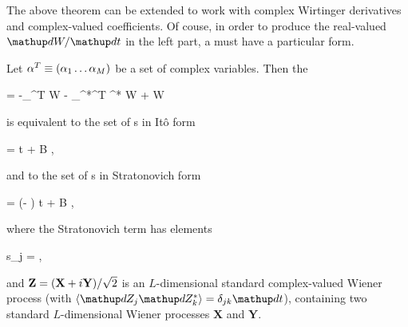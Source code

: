 The above theorem can be extended to work with complex Wirtinger derivatives and complex-valued coefficients.
Of couse, in order to produce the real-valued $\upd W/\upd t$ in the left part, a  must have a particular form.

\begin{theorem}
\label{thm:fpe-sde:corr:fpe-sde-complex}
	Let $\mathbf{\alpha}^T \equiv (\alpha_1 \ldots \alpha_M)$ be a set of complex variables.
	Then the 
	\begin{eqn*}
		= -\vcwd_{\balpha}^T \avec W - \vcwd_{\balpha^*}^T \avec^* W
		+  W
	\end{eqn*}
	is equivalent to the set of s in It\^{o} form
	\begin{eqn*}
		\upd\balpha = \avec \upd t + B \upd\Zvec,
	\end{eqn*}
	and to the set of s in Stratonovich form
	\begin{eqn*}
		\upd\balpha = (\avec - \svec) \upd t + B \upd\Zvec,
	\end{eqn*}
	where the Stratonovich term has elements
	\begin{eqn*}
		s_j =  \Trace{ B^H \vcwd_{\balpha^*} \evec_j^T B },
	\end{eqn*}
	and $\mathbf{Z} = (\mathbf{X} + i\mathbf{Y}) / \sqrt{2}$ is an $L$-dimensional standard complex-valued Wiener process (with $\langle \upd Z_j \upd Z_k^* \rangle = \delta_{jk} \upd t$), containing two standard $L$-dimensional Wiener processes $\mathbf{X}$ and $\mathbf{Y}$.
\end{theorem}
